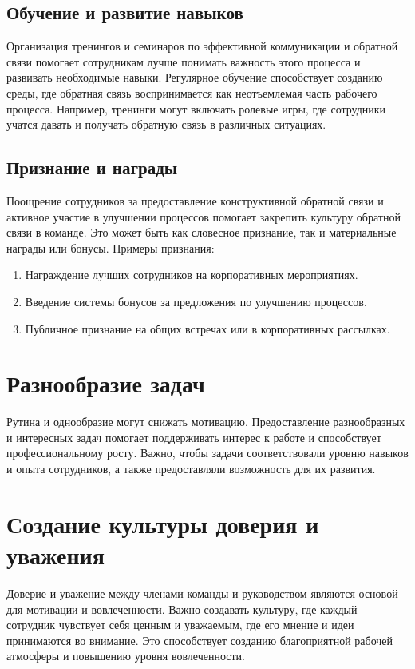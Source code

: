     \subsection*{Обучение и развитие навыков}
    Организация тренингов и семинаров по эффективной коммуникации и обратной связи помогает сотрудникам лучше понимать важность этого процесса и развивать необходимые навыки. Регулярное обучение способствует созданию среды, где обратная связь воспринимается как неотъемлемая часть рабочего процесса. Например, тренинги могут включать ролевые игры, где сотрудники учатся давать и получать обратную связь в различных ситуациях.

    \subsection*{Признание и награды}
    Поощрение сотрудников за предоставление конструктивной обратной связи и активное участие в улучшении процессов помогает закрепить культуру обратной связи в команде. Это может быть как словесное признание, так и материальные награды или бонусы. Примеры признания:
    
    \begin{enumerate}
        \item Награждение лучших сотрудников на корпоративных мероприятиях.
        \item Введение системы бонусов за предложения по улучшению процессов.
        \item Публичное признание на общих встречах или в корпоративных рассылках.
    \end{enumerate}

    \section*{Разнообразие задач}
    Рутина и однообразие могут снижать мотивацию. Предоставление разнообразных и интересных задач помогает поддерживать интерес к работе и способствует профессиональному росту. Важно, чтобы задачи соответствовали уровню навыков и опыта сотрудников, а также предоставляли возможность для их развития.

    \section{Создание культуры доверия и уважения}
    Доверие и уважение между членами команды и руководством являются основой для мотивации и вовлеченности. Важно создавать культуру, где каждый сотрудник чувствует себя ценным и уважаемым, где его мнение и идеи принимаются во внимание. Это способствует созданию благоприятной рабочей атмосферы и повышению уровня вовлеченности.

